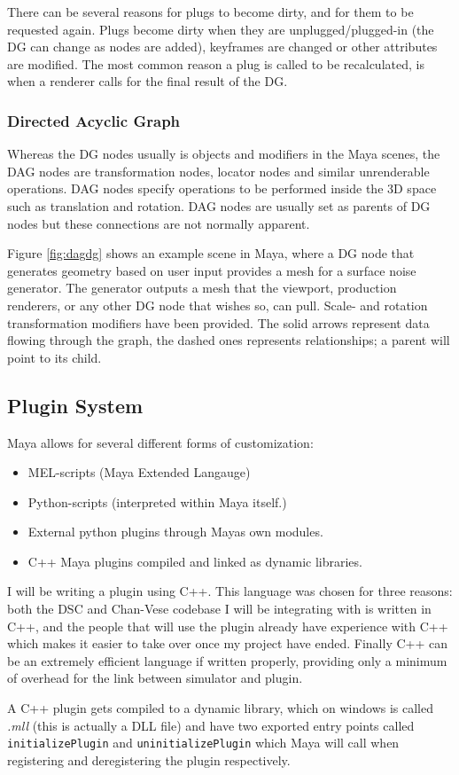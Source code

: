 There can be several reasons for plugs to become dirty, and for them to be
requested again. Plugs become dirty when they are unplugged/plugged-in (the DG
can change as nodes are added), keyframes are changed or other attributes are
modified. The most common reason a plug is called to be recalculated, is when a
renderer calls for the final result of the DG.

\subsubsection{Directed Acyclic Graph}

Whereas the DG nodes usually is objects and modifiers in the Maya scenes, the
DAG nodes are transformation nodes, locator nodes and similar unrenderable
operations. DAG nodes specify operations to be performed inside the 3D space
such as translation and rotation. DAG nodes are usually set as parents of DG
nodes but these connections are not normally apparent.


Figure \ref{fig:dagdg} shows an example scene in Maya, where a DG node that
generates geometry based on user input provides a mesh for a surface noise
generator. The generator outputs a mesh that the viewport, production renderers,
or any other DG node that wishes so, can pull. Scale- and rotation transformation
modifiers have been provided. The solid arrows represent data flowing through
the graph, the dashed ones represents relationships; a parent will point to its
child.

\subsection{Plugin System}
\label{sec:pluginsystem}
Maya allows for several different forms of customization:
\begin{itemize}
  \item MEL-scripts (Maya Extended Langauge)
  \item Python-scripts (interpreted within Maya itself.)
  \item External python plugins through Mayas own modules.
  \item C++ Maya plugins compiled and linked as dynamic libraries.
\end{itemize}

I will be writing a plugin using C++. This language was chosen for three reasons:
both the DSC and Chan-Vese codebase I will be integrating with is written in
C++, and the people that will use the plugin already have experience with C++
which makes it easier to take over once my project have ended. Finally C++
can be an extremely efficient language if written properly, providing only a
minimum of overhead for the link between simulator and plugin.

A C++ plugin gets compiled to a dynamic library, which on windows is called
\textit{.mll} (this is actually a DLL file) and have two exported entry points
called \texttt{initializePlugin} and \texttt{uninitializePlugin} which Maya will
call when registering and deregistering the plugin respectively.